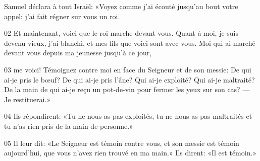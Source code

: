 Samuel déclara à tout Israël: «Voyez comme j’ai écouté jusqu’au bout votre appel: j’ai fait régner sur vous un roi.

02 Et maintenant, voici que le roi marche devant vous. Quant à moi, je suis devenu vieux, j’ai blanchi, et mes fils que voici sont avec vous. Moi qui ai marché devant vous depuis ma jeunesse jusqu’à ce jour,

03 me voici! Témoignez contre moi en face du Seigneur et de son messie: De qui ai-je pris le bœuf? De qui ai-je pris l’âne? Qui ai-je exploité? Qui ai-je maltraité? De la main de qui ai-je reçu un pot-de-vin pour fermer les yeux sur son cas? --- Je restituerai.»

04 Ils répondirent: «Tu ne nous as pas exploités, tu ne nous as pas maltraités et tu n’as rien pris de la main de personne.»

05 Il leur dit: «Le Seigneur est témoin contre vous, et son messie est témoin aujourd’hui, que vous n’avez rien trouvé en ma main.» Ils dirent: «Il est témoin.»
